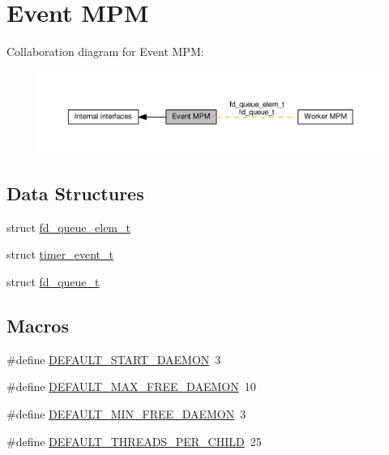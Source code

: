 \hypertarget{group__APACHE__MPM__EVENT}{}\section{Event M\+PM}
\label{group__APACHE__MPM__EVENT}
Collaboration diagram for Event M\+PM\+:
\nopagebreak
\begin{figure}[H]
\begin{center}
\leavevmode
\includegraphics[width=350pt]{group__APACHE__MPM__EVENT}
\end{center}
\end{figure}
\subsection*{Data Structures}
\begin{DoxyCompactItemize}
\item 
struct \hyperlink{structfd__queue__elem__t}{fd\+\_\+queue\+\_\+elem\+\_\+t}
\item 
struct \hyperlink{structtimer__event__t}{timer\+\_\+event\+\_\+t}
\item 
struct \hyperlink{structfd__queue__t}{fd\+\_\+queue\+\_\+t}
\end{DoxyCompactItemize}
\subsection*{Macros}
\begin{DoxyCompactItemize}
\item 
\#define \hyperlink{group__APACHE__MPM__EVENT_gac3950e57f9e8a7cfe6ff3fa67237e604}{D\+E\+F\+A\+U\+L\+T\+\_\+\+S\+T\+A\+R\+T\+\_\+\+D\+A\+E\+M\+ON}~3
\item 
\#define \hyperlink{group__APACHE__MPM__EVENT_ga77abf0320697e196e2d1d282cca9ad44}{D\+E\+F\+A\+U\+L\+T\+\_\+\+M\+A\+X\+\_\+\+F\+R\+E\+E\+\_\+\+D\+A\+E\+M\+ON}~10
\item 
\#define \hyperlink{group__APACHE__MPM__EVENT_gabfe5932653591d3339a6620cbd0d40be}{D\+E\+F\+A\+U\+L\+T\+\_\+\+M\+I\+N\+\_\+\+F\+R\+E\+E\+\_\+\+D\+A\+E\+M\+ON}~3
\item 
\#define \hyperlink{group__APACHE__MPM__EVENT_gaf3e2d0fe4c45aac538a61bf99d69a378}{D\+E\+F\+A\+U\+L\+T\+\_\+\+T\+H\+R\+E\+A\+D\+S\+\_\+\+P\+E\+R\+\_\+\+C\+H\+I\+LD}~25
\end{DoxyCompactItemize}
